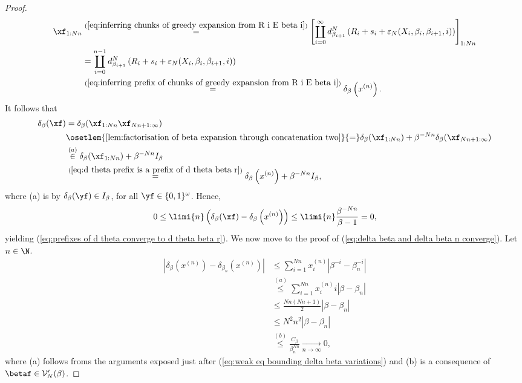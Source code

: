 \begin{proof}
	\begin{align}
		\xf_{1:Nn} &\overset{(\ref{eq:inferring chunks of greedy expansion from R i E beta i})}{=} \left[\coprod_{i=0}^{\infty} d_{\beta_{i+1}}^N\left(R_i +  s_i + \varepsilon_N(X_i, \beta_i, \beta_{i+1} , i)\right)\right]_{1:Nn}\\
		&= \coprod_{i=0}^{n-1} d_{\beta_{i+1}}^N\left(R_i +  s_i + \varepsilon_N(X_i, \beta_i, \beta_{i+1} , i)\right)\\
		&\overset{(\ref{eq:inferring prefix of chunks of greedy expansion from R i E beta i})}{=} \delta_\beta\left(x^{(n)}\right).\label{eq:d theta prefix is a prefix of d theta beta r}
	\end{align}
	It follows that
	\begin{align}
		\delta_\beta(\xf) &= \delta_\beta(\xf_{1:Nn} \xf_{Nn+1:\infty})\\
		&\osetlem{\ref{lem:factorisation of beta expansion through concatenation two}}{=} \delta_\beta(\xf_{1:Nn}) + \beta^{-Nn} \delta_\beta(\xf_{Nn+1:\infty})\\
		&\overset{(a)}{\in} \delta_\beta(\xf_{1:Nn}) + \beta^{-Nn} I_\beta\\
		&\overset{(\ref{eq:d theta prefix is a prefix of d theta beta r})}{=} \delta_\beta\left(x^{(n)}\right)  + \beta^{-Nn}I_\beta,
	\end{align}
	where (a) is by $\delta_\beta(\yf) \in I_\beta$, for all $\yf \in \{0,1\}^\omega$. Hence, 
	\begin{equation}
		0 \leq \limi{n} \left(\delta_\beta(\xf) - \delta_\beta\left(x^{(n)}\right)\right) \leq \limi{n} \frac{\beta^{-Nn}}{\beta-1} = 0,
	\end{equation}
	yielding (\ref{eq:prefixes of d theta converge to d theta beta r}). We now move to the proof of (\ref{eq:delta beta and delta beta n converge}). Let $n \in \N$.
	\begin{align}
		\left|\delta_{\beta}\left(x^{(n)}\right) - \delta_{\beta_n}\left(x^{(n)}\right)\right| & \leq \sum_{i=1}^{Nn} x^{(n)}_i |\beta^{-i} - \beta_n^{-i}|\\
		& \overset{(a)}{\leq} \sum_{i=1}^{Nn} x^{(n)}_i i |\beta - \beta_n|\\
		& \leq \frac{Nn(Nn+1)}{2} |\beta - \beta_n|\\
		& \leq N^2n^2 |\beta - \beta_n|\\
		& \overset{(b)}{\leq} \frac{C_\beta}{\beta_n^{Nn}} \underset{n \to \infty}{\to} 0,
	\end{align}
	where (a) follows froms the arguments exposed just after (\ref{eq:weak eq bounding delta beta variations}) and (b) is a consequence of $\betaf \in \mathcal V'_N(\beta)$.
	

\end{proof}

